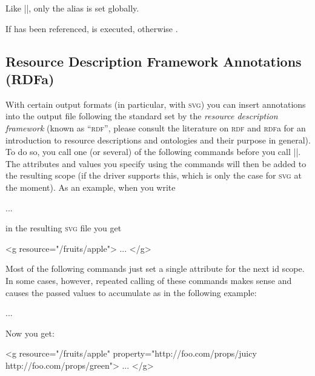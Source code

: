 \begin{command}{\pgfgaliasid{}}
    Like |\pgfaliasid|, only the alias is set globally.
\end{command}

\begin{command}{\pgfifidreferenced{}}
    If  has been referenced,  is executed, otherwise
    .
\end{command}


\subsection{Resource Description Framework Annotations (RDFa)}
\label{section-base-rdf}

With certain output formats (in particular, with \textsc{svg}) you can insert
annotations into the output file following the standard set by the
\emph{resource description framework} (known as ``\textsc{rdf}'', please
consult the literature on \textsc{rdf} and \textsc{rdf}a for an introduction to
resource descriptions and ontologies and their purpose in general). To do so,
you call one (or several) of the following commands before you call
|\pgfidscope|. The attributes and values you specify using the commands will
then be added to the resulting scope (if the driver supports this, which is
only the case for \textsc{svg} at the moment). As an example, when you write
%
\begin{codeexample}
\pgfidscope
...
\pgfendidscope
\end{codeexample}

in the resulting \textsc{svg} file you get
%
\begin{codeexample}
<g resource="/fruits/apple">
  ...
</g>
\end{codeexample}

Most of the following commands just set a single attribute for the next id
scope. In some cases, however, repeated calling of these commands makes sense
and causes the passed values to accumulate as in the following example:
%
\begin{codeexample}
\pgfidscope
...
\pgfendidscope
\end{codeexample}

Now you get:
%
\begin{codeexample}
<g resource="/fruits/apple"
   property="http://foo.com/props/juicy http://foo.com/props/green">
  ...
</g>
\end{codeexample}

